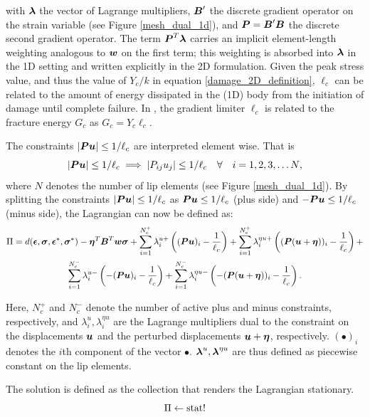 \documentclass[10pt,review]{cas-sc}
\begin{document}
with $\mbox{\boldmath $\lambda$}$ the vector of Lagrange multipliers, $\mbox{\boldmath $B$}'$ the discrete gradient operator on the strain variable (see Figure \ref{mesh_dual_1d}), and $\mbox{\boldmath $P$} = \mbox{\boldmath $B$}' \mbox{\boldmath $B$}$ the discrete second gradient operator. The term $\mbox{\boldmath $P$}^T \mbox{\boldmath $\lambda$}$ carries an implicit element-length weighting analogous to $\mbox{\boldmath $w$}$ on the first term; this weighting is absorbed into $\mbox{\boldmath $\lambda$}$ in the 1D setting and written explicitly in the 2D formulation. Given the peak stress value, and thus the value of $Y_c/k$ in equation \ref{damage_2D_definition}, $\ell_c$ can be related to the amount of energy dissipated in the (1D) body from the initiation of damage until complete failure. In \cite[eq. 55]{Kamasamudram2023}, the gradient limiter $\ell_c$ is related to the fracture energy $G_c$ as $G_c = Y_c \ell_c$.

The constraints $|\mbox{\boldmath $P$} \mbox{\boldmath $u$}|  \leq 1/{\ell_c}$ are interpreted element wise. That is
\begin{equation}
	|\mbox{\boldmath $P$} \mbox{\boldmath $u$}|  \leq 1/{\ell_c} \implies |P_{ij}u_j|  \leq 1/{\ell_c} \quad \forall \quad i={1,2,3,\dots N},
\end{equation}
where  $N$ denotes the number of lip elements (see Figure \ref{mesh_dual_1d}).  By splitting the constraints $|\mbox{\boldmath $P$} \mbox{\boldmath $u$}|  \leq 1/{\ell_c}$ as $\mbox{\boldmath $P$} \mbox{\boldmath $u$}  \leq 1/{\ell_c}$ (plus side) and $-\mbox{\boldmath $P$} \mbox{\boldmath $u$}  \leq 1/{\ell_c}$ (minus side), the Lagrangian can now be defined as:
\begin{multline}
	\Pi = d(\mbox{\boldmath $\epsilon$},\mbox{\boldmath $\sigma$},\mbox{\boldmath $\epsilon$}^*,\mbox{\boldmath $\sigma$}^*) - \mbox{\boldmath $\eta$}^T \mbox{\boldmath $B$} ^T \mbox{\boldmath $w$}\mbox{\boldmath $\sigma$} + \sum_{i=1}^{N_c^+} \lambda^{u+}_i \left( (\mbox{\boldmath $P$} \mbox{\boldmath $u$})_i - \frac{1}{\ell_c}   \right) + \sum_{i=1}^{N_c^+} \lambda^{\eta u +}_i \left( (\mbox{\boldmath $P$} (\mbox{\boldmath $u$} + \mbox{\boldmath $\eta$}))_i - \frac{1}{\ell_c}   \right) + \\
	\sum_{i=1}^{N_c^-} \lambda^{u-}_i \left( -(\mbox{\boldmath $P$} \mbox{\boldmath $u$})_i - \frac{1}{\ell_c}   \right) + \sum_{i=1}^{N_c^-} \lambda^{\eta u-}_i \left( -(\mbox{\boldmath $P$} (\mbox{\boldmath $u$} + \mbox{\boldmath $\eta$}))_i - \frac{1}{\ell_c}   \right) \label{big_1D_lagrangian}.
\end{multline}

Here, $N_c^+$ and $N_c^-$ denote the number of active plus and minus constraints, respectively, and $\lambda^u_i, \lambda^{\eta u}_i$ are the Lagrange multipliers dual to the constraint on the displacements $\mbox{\boldmath $u$}$ and the perturbed displacements $\mbox{\boldmath $u$} + \mbox{\boldmath $\eta$}$, respectively. $(\bullet)_i$ denotes the $i$th component of the vector $\bullet$. $\mbox{\boldmath $\lambda$}^u, \mbox{\boldmath $\lambda$}^{\eta u}$ are thus defined as piecewise constant on the lip elements.

The solution is defined as the collection that renders the Lagrangian stationary.
\begin{equation}
	\Pi  \leftarrow \operatorname{stat}!
\end{equation}
\end{document}

